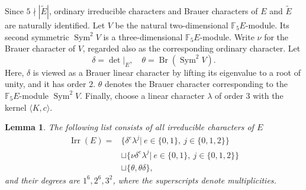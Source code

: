 \documentclass[11pt,a4paper]{article}
\numberwithin{equation}{section}
\newtheorem{lemma}[theorem]{Lemma}
\theoremstyle{definition}
\theoremstyle{remark}
\newcommand{\Irr}{\operatorname{Irr}}
\newcommand{\Sym}{\operatorname{Sym}}
\newcommand{\FF}{\mathbb F}
\newcommand{\et}{\widetilde E}
\begin{document}
Since \(5\nmid|\et|\), ordinary irreducible characters and Brauer characters of \(E\) and \(\et\) are naturally identified. 
Let $V$ be the natural two-dimensional \(\mathbb F_5E\)-module. Its second symmetric $\Sym^2 V$ is a three-dimensional \(\FF_5E\)-module. Write \(\nu\) for the Brauer character of $V$, regarded also as the corresponding ordinary character. 
Let
\[
\delta=\det|_E,\quad \theta=\operatorname{Br}(\Sym^2 V).
\]
Here, $\delta$ is viewed as a Brauer linear character by lifting its eigenvalue to a root of unity, and it has order \(2\).  $\theta$ denotes the Brauer character corresponding to the \(\FF_5E\)-module $\Sym^2 V$. Finally, choose a linear character \(\lambda\) of order \(3\) with the kernel $\langle K,c\rangle$.
\begin{lemma}\label{p5:lem:localchars}
The following list consists of all irreducible characters of \(E\)
\begin{equation*}%
 \begin{split}
 \Irr(E)={}&\{\delta^e\lambda^j|\ e\in\{0,1\},\ j\in\{0,1,2\}\}\\
 &\sqcup\{\nu\delta^e\lambda^j| \ e\in\{0,1\},\ j\in\{0,1,2\}\}\\
 &\sqcup\{\theta,\theta\delta\},
 \end{split}
\end{equation*}
and their degrees are \(1^6,2^6,3^2\), where the superscripts denote multiplicities.
\end{lemma}
\end{document}
